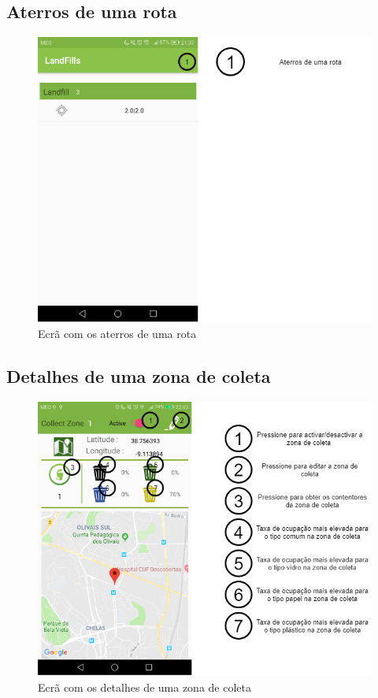 \documentclass[10pt,a5paper]{article}
\begin{document}
\newpage
\subsection{Aterros de uma rota} 

\begin{figure}[!h]
	\centering
	\includegraphics[width=1.1\textwidth]{Images/screens/route_landfills}
	\caption{Ecrã com os aterros de uma rota}
	\label{fig:route_landfills}
\end{figure}

\newpage
\subsection{Detalhes de uma zona de coleta} 
\begin{figure}[!h]
	\centering
	\includegraphics[width=1.1\textwidth]{Images/screens/collect_zone_screen}
	\caption{Ecrã com os detalhes de uma zona de coleta}
	\label{fig:collect_zone_screen}
\end{figure}
\end{document}
